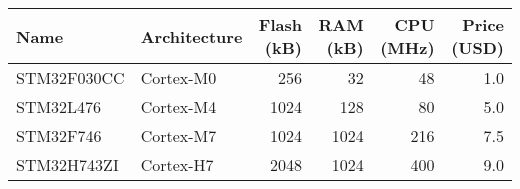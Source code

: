 \begin{tabular}{llrrrr}
\toprule
        Name & Architecture &  Flash (kB) &  RAM (kB) &  CPU (MHz) &  Price (USD) \\
\midrule
 STM32F030CC &    Cortex-M0 &         256 &        32 &         48 &          1.0 \\
   STM32L476 &    Cortex-M4 &        1024 &       128 &         80 &          5.0 \\
   STM32F746 &    Cortex-M7 &        1024 &      1024 &        216 &          7.5 \\
 STM32H743ZI &    Cortex-H7 &        2048 &      1024 &        400 &          9.0 \\
\bottomrule
\end{tabular}

